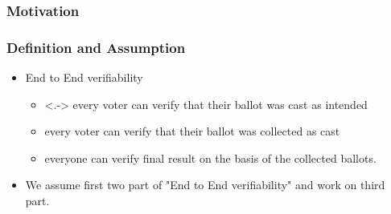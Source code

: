 \documentclass{beamer}
\begin{document}
\begin{frame}
\frametitle{Motivation}
\begin{center}
\end{center}
\end{frame}

\begin{frame}
\frametitle{Definition and Assumption}

\begin{itemize}[<+->]
\item End to End verifiability
\begin{itemize}
  \item<.-> every voter can verify that their ballot was cast as
  intended
  \item every voter can verify that their ballot was collected as
  cast
  \item everyone can verify final result on the basis of the
  collected ballots.
\end{itemize}

\item We assume first two part of "End to End verifiability" and work on
      third part.

\end{itemize}
\end{frame}
\end{document}
